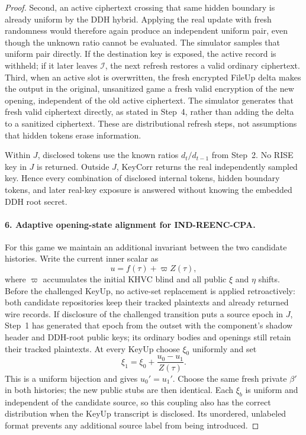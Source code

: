 \begin{proof}
Second, an active ciphertext crossing that same hidden boundary is already uniform by the DDH hybrid. Applying the real update with fresh randomness would therefore again produce an independent uniform pair, even though the unknown ratio cannot be evaluated. The simulator samples that uniform pair directly. If the destination key is exposed, the active record is withheld; if it later leaves $\mathcal I$, the next refresh restores a valid ordinary ciphertext. Third, when an active slot is overwritten, the fresh encrypted FileUp delta makes the output in the original, unsanitized game a fresh valid encryption of the new opening, independent of the old active ciphertext. The simulator generates that fresh valid ciphertext directly, as stated in Step~4, rather than adding the delta to a sanitized ciphertext. These are distributional refresh steps, not assumptions that hidden tokens erase information.

Within $J$, disclosed tokens use the known ratios $d_t/d_{t-1}$ from Step~2. No RISE key in $J$ is returned. Outside $J$, KeyCorr returns the real independently sampled key. Hence every combination of disclosed internal tokens, hidden boundary tokens, and later real-key exposure is answered without knowing the embedded DDH root secret.

\paragraph{6. Adaptive opening-state alignment for IND-REENC-CPA.}
For this game we maintain an additional invariant between the two candidate histories. Write the current inner scalar as
\[
 u=f(\tau)+\varpi Z(\tau),
\]
where $\varpi$ accumulates the initial KHVC blind and all public $\xi$ and $\eta$ shifts. Before the challenged KeyUp, no active-set replacement is applied retroactively: both candidate repositories keep their tracked plaintexts and already returned wire records. If disclosure of the challenged transition puts a source epoch in $J$, Step~1 has generated that epoch from the outset with the component's shadow header and DDH-root public keys; its ordinary bodies and openings still retain their tracked plaintexts. At every KeyUp choose $\xi_0$ uniformly and set
\[
 \xi_1=\xi_0+\frac{u_0-u_1}{Z(\tau)} .
\]
This is a uniform bijection and gives $u_0'=u_1'$. Choose the same fresh private $\beta'$ in both histories; the new public stubs are then identical. Each $\xi_b$ is uniform and independent of the candidate source, so this coupling also has the correct distribution when the KeyUp transcript is disclosed. Its unordered, unlabeled format prevents any additional source label from being introduced.


\end{proof}
